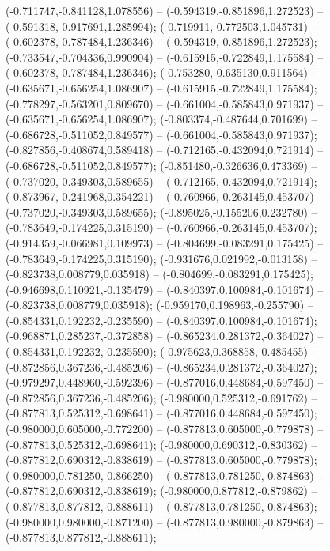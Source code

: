  (-0.711747,-0.841128,1.078556) -- (-0.594319,-0.851896,1.272523) -- (-0.591318,-0.917691,1.285994);
 (-0.719911,-0.772503,1.045731) -- (-0.602378,-0.787484,1.236346) -- (-0.594319,-0.851896,1.272523);
 (-0.733547,-0.704336,0.990904) -- (-0.615915,-0.722849,1.175584) -- (-0.602378,-0.787484,1.236346);
 (-0.753280,-0.635130,0.911564) -- (-0.635671,-0.656254,1.086907) -- (-0.615915,-0.722849,1.175584);
 (-0.778297,-0.563201,0.809670) -- (-0.661004,-0.585843,0.971937) -- (-0.635671,-0.656254,1.086907);
 (-0.803374,-0.487644,0.701699) -- (-0.686728,-0.511052,0.849577) -- (-0.661004,-0.585843,0.971937);
 (-0.827856,-0.408674,0.589418) -- (-0.712165,-0.432094,0.721914) -- (-0.686728,-0.511052,0.849577);
 (-0.851480,-0.326636,0.473369) -- (-0.737020,-0.349303,0.589655) -- (-0.712165,-0.432094,0.721914);
 (-0.873967,-0.241968,0.354221) -- (-0.760966,-0.263145,0.453707) -- (-0.737020,-0.349303,0.589655);
 (-0.895025,-0.155206,0.232780) -- (-0.783649,-0.174225,0.315190) -- (-0.760966,-0.263145,0.453707);
 (-0.914359,-0.066981,0.109973) -- (-0.804699,-0.083291,0.175425) -- (-0.783649,-0.174225,0.315190);
 (-0.931676,0.021992,-0.013158) -- (-0.823738,0.008779,0.035918) -- (-0.804699,-0.083291,0.175425);
 (-0.946698,0.110921,-0.135479) -- (-0.840397,0.100984,-0.101674) -- (-0.823738,0.008779,0.035918);
 (-0.959170,0.198963,-0.255790) -- (-0.854331,0.192232,-0.235590) -- (-0.840397,0.100984,-0.101674);
 (-0.968871,0.285237,-0.372858) -- (-0.865234,0.281372,-0.364027) -- (-0.854331,0.192232,-0.235590);
 (-0.975623,0.368858,-0.485455) -- (-0.872856,0.367236,-0.485206) -- (-0.865234,0.281372,-0.364027);
 (-0.979297,0.448960,-0.592396) -- (-0.877016,0.448684,-0.597450) -- (-0.872856,0.367236,-0.485206);
 (-0.980000,0.525312,-0.691762) -- (-0.877813,0.525312,-0.698641) -- (-0.877016,0.448684,-0.597450);
 (-0.980000,0.605000,-0.772200) -- (-0.877813,0.605000,-0.779878) -- (-0.877813,0.525312,-0.698641);
 (-0.980000,0.690312,-0.830362) -- (-0.877812,0.690312,-0.838619) -- (-0.877813,0.605000,-0.779878);
 (-0.980000,0.781250,-0.866250) -- (-0.877813,0.781250,-0.874863) -- (-0.877812,0.690312,-0.838619);
 (-0.980000,0.877812,-0.879862) -- (-0.877813,0.877812,-0.888611) -- (-0.877813,0.781250,-0.874863);
 (-0.980000,0.980000,-0.871200) -- (-0.877813,0.980000,-0.879863) -- (-0.877813,0.877812,-0.888611);
